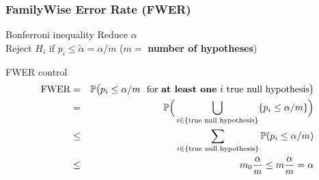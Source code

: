 \documentclass[xcolor={dvipsnames}]{beamer}
\newcommand{\bb}[1]{\begin{block}{#1}}
\newcommand{\eb}{\end{block}}
\newcommand{\bi}{\begin {itemize}}
\newcommand{\ei}{\end{itemize}}
\newcommand{\bfr}[1]{\begin{frame} \frametitle{#1}}
\begin{document}
\bfr{FamilyWise Error Rate (FWER)}


\bb{Bonferroni inequality}
     {Reduce $\alpha$} \\
    Reject $H_i$ if $\boxed{p_i \leq \widetilde{\alpha} =\alpha/m}$ ($m=$ \textbf{number of hypotheses})
\eb
  \bb{FWER control}
    \begin{eqnarray*}
    \mathrm{FWER} &=& \mathbb{P} \big(p_i \leq \alpha/m\ \text{ for \textbf{at least one} $i$ true null hypothesis} \big) \\
    &=& \mathbb{P} \Big( \bigcup_{i\in \{\text{true null hypothesis}\}} \{p_i \leq \alpha/m\} \Big) \\
    &\leq& \sum_{i \in \{\text{true null hypothesis}\}} \mathbb{P} (p_i \leq \alpha/m) \\
    &\leq& m_0\frac{\alpha}{m} \leq m \frac{\alpha}{m}  = \alpha
    \end{eqnarray*}
  \eb
\end{frame}
% 
% 
% 


% 
\end{document}
